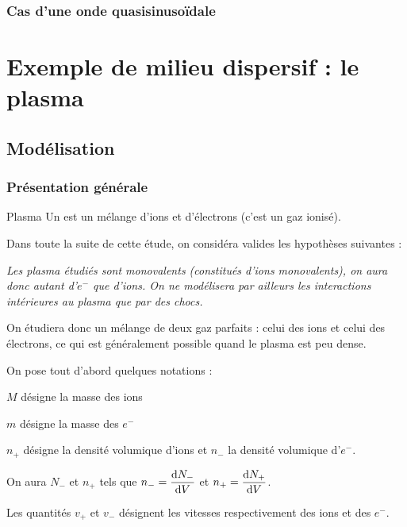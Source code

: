 \documentclass[a4paper,french,bookmarks]{book}
\begin{document}
    \subsubsection*{Cas d'une onde quasisinusoïdale}
    
    \newpage
    
    \section{Exemple de milieu dispersif : le plasma}
    
    \subsection{Modélisation}
    
    \subsubsection*{Présentation générale}
    
    \begin{definition}{Plasma}{}
        Un  est un mélange d'ions et d'électrons (c'est un gaz ionisé).
    \end{definition}
    
    Dans toute la suite de cette étude, on considéra valides les hypothèses suivantes :
    \begin{center}
        \begin{minipage}{0.7\linewidth}
            \emph{Les plasma étudiés sont monovalents (constitués d'ions monovalents), on aura donc autant d'$e^-$ que d'ions. On ne modélisera par ailleurs les interactions intérieures au plasma que par des chocs.}
        \end{minipage}
    \end{center}
    On étudiera donc un mélange de deux gaz parfaits : celui des ions et celui des électrons, ce qui est généralement possible quand le plasma est peu dense.
    
    
    
    \begin{notation}
        On pose tout d'abord quelques notations :
        \begin{enumerate}
            \itt $M$ désigne la masse des ions
            
            \itt $m$ désigne la masse des $e^-$
            
            \itt $n_+$ désigne la densité volumique d'ions et $n_-$ la densité volumique d'$e^-$.
            
            \itt On aura $N_-$ et $n_+$ tels que $n_- = \dfrac{\mathrm d N_-}{\mathrm d V}$ et $n_+ = \dfrac{\mathrm d N_+}{\mathrm d V}$.
            
            \itt Les quantités $v_+$ et $v_-$ désignent les vitesses  respectivement des ions et des $e^-$.
        \end{enumerate}
    \end{notation}
    
\end{document}
